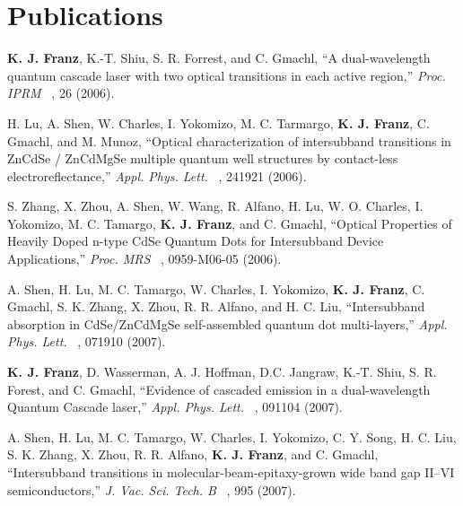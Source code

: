 %


\chapter*{Publications}
\renewcommand{\chaptermark}[1]{%
\markboth{\normalfont \textbf{\textsl{#1}}}{}}

\chaptermark{Publications}



\begin{list}{}{
  \setlength{\leftmargin}{0.25in}
  \setlength{\rightmargin}{0.25in}
  \setlength{\itemsep}{6pt}
}
\item \textbf{K. J. Franz}, K.-T. Shiu, S. R. Forrest, and C. Gmachl, ``A dual-wavelength quantum cascade laser with two optical transitions in each active region,'' \emph{Proc. IPRM}~ , 26 (2006).
\item H. Lu, A. Shen, W. Charles, I. Yokomizo, M. C. Tarmargo, \textbf{K. J. Franz}, C. Gmachl, and M. Munoz, ``Optical characterization of intersubband transitions in \linebreak ZnCdSe / ZnCdMgSe multiple quantum well structures by contact-less electroreflectance,'' \emph{Appl. Phys. Lett.}~ , 241921 (2006).
\item S. Zhang, X. Zhou, A. Shen, W. Wang, R. Alfano, H. Lu, W. O. Charles, I. Yokomizo, M. C. Tamargo, \textbf{K. J. Franz}, and C. Gmachl, ``Optical Properties of Heavily Doped  n-type CdSe Quantum Dots for Intersubband Device Applications,'' \emph{Proc. MRS}~ \linebreak {}, 0959-M06-05 (2006).
\item A. Shen, H. Lu, M. C. Tamargo, W. Charles, I. Yokomizo, \textbf{K. J. Franz}, C. Gmachl, S. K. Zhang, X. Zhou, R. R. Alfano, and H. C. Liu, ``Intersubband absorption in CdSe/ZnCdMgSe self-assembled quantum dot multi-layers,'' \emph{Appl. Phys. Lett.}~ , 071910 (2007).
\item \textbf{K. J. Franz}, D. Wasserman, A. J. Hoffman, D.C. Jangraw, K.-T. Shiu, S. R. Forest, and C. Gmachl, ``Evidence of cascaded emission in a dual-wavelength Quantum Cascade laser,'' \emph{Appl. Phys. Lett.}~ , 091104 (2007).
\item A. Shen, H. Lu, M. C. Tamargo, W. Charles, I. Yokomizo, C. Y. Song, H. C. Liu,  \linebreak S. K. Zhang, X. Zhou, R. R. Alfano, \textbf{K. J. Franz}, and C. Gmachl, ``Intersubband transitions in molecular-beam-epitaxy-grown wide band gap II--VI semiconductors,'' \emph{J. Vac. Sci. Tech. B}~ , 995 (2007).

\end{list}
